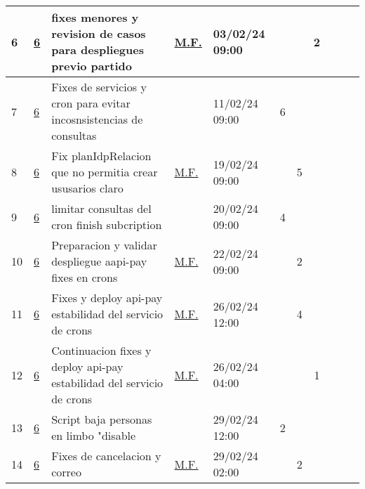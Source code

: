 \documentclass{article}
\begin{document}
\begin{longtable}{|m{0.5cm}|m{1.2cm}|p{5cm}|m{1.5cm}|m{1.5cm}||c|c|c|c|c|c|    |}
                 \label{6}6  &  \hyperref[6]{\color{blue}6}  & fixes menores y revision de casos para despliegues previo partido &  
                  \hyperref[M.F.]{\color{blue}M.F.}  & 03/02/24 09:00  &  &  & 2 &  &  & \\ \hline 

                 \label{7}7  &  \hyperref[6]{\color{blue}6}  & Fixes de servicios y cron para evitar incosnsistencias de consultas &  
                 & 11/02/24 09:00  & 6 &  &  &  &  & \\ \hline 

                 \label{8}8  &  \hyperref[6]{\color{blue}6}  & Fix planIdpRelacion que no permitia crear ususarios claro &  
                  \hyperref[M.F.]{\color{blue}M.F.}  & 19/02/24 09:00  &  & 5 &  &  &  & \\ \hline 

                 \label{9}9  &  \hyperref[6]{\color{blue}6}  & limitar consultas del cron finish subcription &  
                 & 20/02/24 09:00  & 4 &  &  &  &  & \\ \hline 

                 \label{10}10  &  \hyperref[6]{\color{blue}6}  & Preparacion y validar despliegue aapi-pay fixes en crons &  
                  \hyperref[M.F.]{\color{blue}M.F.}  & 22/02/24 09:00  &  & 2 &  &  &  & \\ \hline 

                 \label{11}11  &  \hyperref[6]{\color{blue}6}  & Fixes y deploy api-pay estabilidad del servicio de crons &  
                  \hyperref[M.F.]{\color{blue}M.F.}  & 26/02/24 12:00  &  & 4 &  &  &  & \\ \hline 

                 \label{12}12  &  \hyperref[6]{\color{blue}6}  & Continuacion fixes y deploy api-pay estabilidad del servicio de crons &  
                  \hyperref[M.F.]{\color{blue}M.F.}  & 26/02/24 04:00  &  &  & 1 &  &  & \\ \hline 

                 \label{13}13  &  \hyperref[6]{\color{blue}6}  & Script baja personas en limbo "disable &  
                 & 29/02/24 12:00  & 2 &  &  &  &  & \\ \hline 

                 \label{14}14  &  \hyperref[6]{\color{blue}6}  & Fixes de cancelacion y correo &  
                  \hyperref[M.F.]{\color{blue}M.F.}  & 29/02/24 02:00  &  & 2 &  &  &  & \\ \hline 


\end{longtable}
\end{document}
